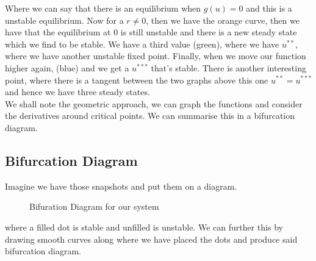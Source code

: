 Where we can say that there is an equilibrium when $g(u) = 0$ and this is a unstable equilibrium. Now for a $r \ne 0$, then we have the orange curve, then we have that the equilibrium at $0$ is still unstable and there is a new steady state which we find to be stable. We have a third value (green), where we have $u^{**}$, where we have another unstable fixed point. Finally, when we move our function higher again, (blue) and we get a $u^{***}$ that's stable. There is another interesting point, where there is a tangent between the two graphs above this one $u^{**} = u^{***}$ and hence we have three steady states.\\

\noindent
We shall note the geometric approach, we can graph the functions and consider the derivatives around critical points. We can summarise this in a bifurcation diagram.

\subsection{Bifurcation Diagram}
Imagine we have those snapshots and put them on a diagram.
\begin{figure}[!ht]
\centering
{}
\caption{Bifuration Diagram for our system}
\end{figure}
where a filled dot is stable and unfilled is unstable. We can further this by drawing smooth curves along where we have placed the dots and produce said bifurcation diagram. \\

